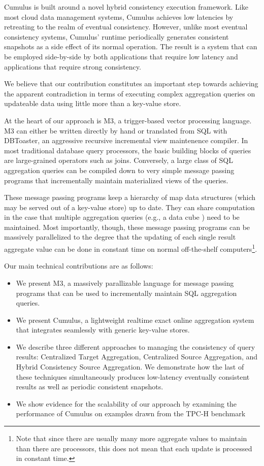 \documentclass{vldb}
\begin{document}
Cumulus is built around a novel hybrid consistency execution framework.  Like most cloud data management systems, Cumulus achieves low latencies by retreating to the realm of eventual consistency.  However, unlike most eventual consistency systems, Cumulus' runtime periodically generates consistent snapshots as a side effect of its normal operation.  The result is a system that can be employed side-by-side by both applications that require low latency and applications that require strong consistency.

We believe that our contribution constitutes an important step towards achieving the apparent contradiction in terms of executing complex aggregation queries on updateable data using little more than a key-value store.

At the heart of our approach is M3, a trigger-based vector processing language.  M3 can either be written directly by hand or translated from SQL with DBToaster\cite{1687592}, an aggressive recursive incremental view maintenence compiler.  In most traditional database query processors, the basic building blocks of queries are large-grained operators such as joins.  Conversely, a large class of SQL aggregation queries can be compiled down to very simple message passing programs that incrementally maintain materialized views of the queries.

These message passing programs keep a hierarchy of map data structures (which may be served out of a key-value store) up to date. They can share computation in the case that multiple aggregation queries (e.g., a data cube \cite{datacube}) need to be maintained.  Most importantly, though, these message passing programs can be massively parallelized to the degree that the updating of each single result aggregate value can be done in constant time on normal off-the-shelf computers\footnote{Note that since there are
usually many more aggregate values to maintain than there are processors,
this does not mean that each update is processed in constant time.}.

Our main technical contributions are as follows:
\begin{itemize}
\item We present M3, a massively parallizable language for message passing programs that can be used to incrementally maintain SQL aggregation queries.
\item We present Cumulus, a lightweight realtime exact online aggregation system that integrates seamlessly with generic key-value stores. 
\item We describe three different approaches to managing the consistency of query results: Centralized Target Aggregation, Centralized Source Aggregation, and Hybrid Consistency Source Aggregation.  We demonstrate how the last of these techniques simultaneously produces low-latency eventually consistent results as well as periodic consistent snapshots.
\item We show evidence for the scalability of our approach by examining the performance of Cumulus on examples drawn from the TPC-H benchmark\cite{tpch2008}
\end{itemize}
\end{document}
